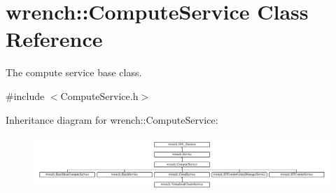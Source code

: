 \hypertarget{classwrench_1_1_compute_service}{}\section{wrench\+:\+:Compute\+Service Class Reference}
\label{classwrench_1_1_compute_service}


The compute service base class.  




{\ttfamily \#include $<$Compute\+Service.\+h$>$}

Inheritance diagram for wrench\+:\+:Compute\+Service\+:\begin{figure}[H]
\begin{center}
\leavevmode
\includegraphics[height=2.137404cm]{classwrench_1_1_compute_service}
\end{center}
\end{figure}
